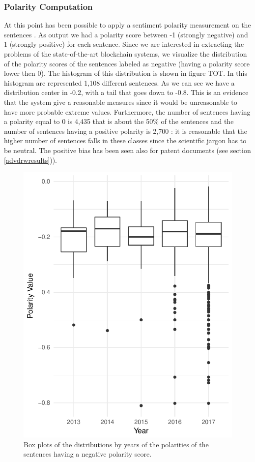 \documentclass[b5paper,]{book}
\theoremstyle{definition}
\theoremstyle{definition}
\theoremstyle{definition}
\theoremstyle{remark}
\begin{document}
\subsubsection*{Polarity Computation}\label{polarity-computation}

At this point has been possible to apply a sentiment polarity
measurement on the sentences \citep{sentimentr2018}. As output we had a
polarity score between -1 (strongly negative) and 1 (strongly positive)
for each sentence. Since we are interested in extracting the problems of
the state-of-the-art blockchain systems, we visualize the distribution
of the polarity scores of the sentences labeled as negative (having a
polarity score lower then 0). The histogram of this distribution is
shown in figure TOT. In this histogram are represented 1,108 different
sentences. As we can see we have a distribution center in -0.2, with a
tail that goes down to -0.8. This is an evidence that the system give a
reasonable measures since it would be unreasonable to have more probable
extreme values. Furthermore, the number of sentences having a polarity
equal to 0 is 4,435 that is about the 50\% of the sentences and the
number of sentences having a positive polarity is 2,700 : it is
reasonable that the higher number of sentences falls in these classes
since the scientific jargon has to be neutral. The positive bias has
been seen also for patent documents (see section \ref{advdrwresults})).

\begin{figure}

{\centering \includegraphics[width=0.5\linewidth]{_bookdown_files/figures/polarity_histogram_time_bl} 

}

\caption{Box plots of the distributions  by years of the polarities of the sentences having a negative polarity score.}\label{fig:sentintimebl}
\end{figure}
\end{document}
